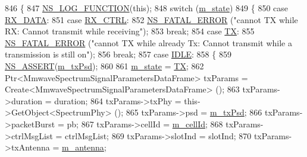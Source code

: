 \begin{DoxyCode}
846 \{
847         \hyperlink{log-macros-disabled_8h_a90b90d5bad1f39cb1b64923ea94c0761}{NS\_LOG\_FUNCTION}(\textcolor{keyword}{this});
848         \textcolor{keywordflow}{switch} (\hyperlink{classns3_1_1MmWaveSpectrumPhy_ab6330aa9de7700e7e15b82000335665d}{m\_state})
849         \{
850         \textcolor{keywordflow}{case} \hyperlink{classns3_1_1MmWaveSpectrumPhy_a665335f60416cf031a9b68209e4368aea5283250c41727eee6b26940406b690d9}{RX\_DATA}:
851   \textcolor{keywordflow}{case} \hyperlink{classns3_1_1MmWaveSpectrumPhy_a665335f60416cf031a9b68209e4368aea1f35c17b447eeb9d376715d1910540fc}{RX\_CTRL}:
852                 \hyperlink{group__fatal_ga5131d5e3f75d7d4cbfd706ac456fdc85}{NS\_FATAL\_ERROR} (\textcolor{stringliteral}{"cannot TX while RX: Cannot transmit while receiving"});
853                 \textcolor{keywordflow}{break};
854         \textcolor{keywordflow}{case} \hyperlink{classns3_1_1MmWaveSpectrumPhy_a665335f60416cf031a9b68209e4368aea1009d660cb8095bc16053fc9909ae695}{TX}:
855                 \hyperlink{group__fatal_ga5131d5e3f75d7d4cbfd706ac456fdc85}{NS\_FATAL\_ERROR} (\textcolor{stringliteral}{"cannot TX while already Tx: Cannot transmit while a
       transmission is still on"});
856                 \textcolor{keywordflow}{break};
857         \textcolor{keywordflow}{case} \hyperlink{classns3_1_1MmWaveSpectrumPhy_a665335f60416cf031a9b68209e4368aeadae9004ebbfa9610354cf62b76eed607}{IDLE}:
858         \{
859                 \hyperlink{assert_8h_a6dccdb0de9b252f60088ce281c49d052}{NS\_ASSERT}(\hyperlink{classns3_1_1MmWaveSpectrumPhy_a74933903ca8be36fdb800f3232a0d10d}{m\_txPsd});
860 
861                 \hyperlink{classns3_1_1MmWaveSpectrumPhy_ab6330aa9de7700e7e15b82000335665d}{m\_state} = \hyperlink{classns3_1_1MmWaveSpectrumPhy_a665335f60416cf031a9b68209e4368aea1009d660cb8095bc16053fc9909ae695}{TX};
862                 Ptr<MmwaveSpectrumSignalParametersDataFrame> txParams = 
      Create<MmwaveSpectrumSignalParametersDataFrame> ();
863                 txParams->duration = duration;
864                 txParams->txPhy = this->GetObject<SpectrumPhy> ();
865                 txParams->psd = \hyperlink{classns3_1_1MmWaveSpectrumPhy_a74933903ca8be36fdb800f3232a0d10d}{m\_txPsd};
866                 txParams->packetBurst = pb;
867                 txParams->cellId = \hyperlink{classns3_1_1MmWaveSpectrumPhy_ac47302ef0f8154064d84adcc0001d77c}{m\_cellId};
868                 txParams->ctrlMsgList = ctrlMsgList;
869                 txParams->slotInd = slotInd;
870                 txParams->txAntenna = \hyperlink{classns3_1_1MmWaveSpectrumPhy_a1f6c5c95f983a34958e8a768ecd611a1}{m\_antenna};

\end{DoxyCode}
